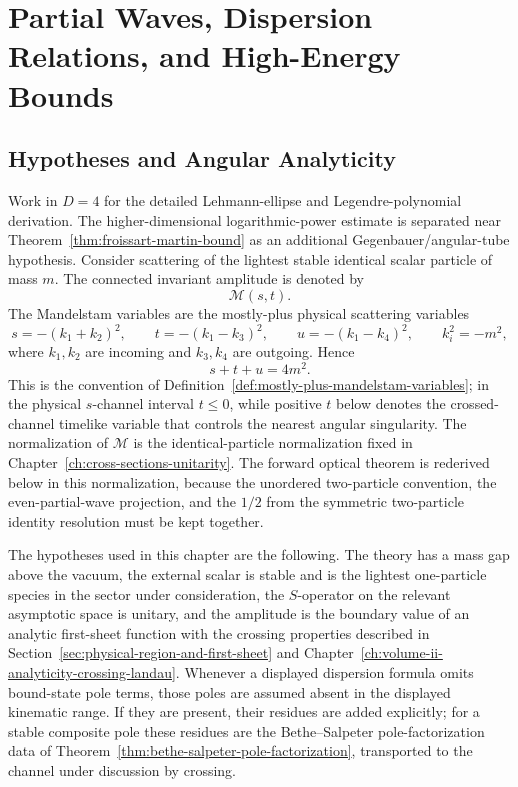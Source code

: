\chapter{Partial Waves, Dispersion Relations, and High-Energy Bounds}
\label{ch:volume-ii-07}
\ConventionsLorentzian


\section{Hypotheses and Angular Analyticity}

Work in \(D=4\) for the detailed Lehmann-ellipse and Legendre-polynomial
derivation.  The higher-dimensional logarithmic-power estimate is separated
near Theorem~\ref{thm:froissart-martin-bound} as an additional
Gegenbauer/angular-tube hypothesis.  Consider scattering of the lightest
stable identical scalar particle of mass \(m\).  The connected invariant
amplitude is denoted
by
\[
  \mathcal M(s,t).
\]
The Mandelstam variables are the mostly-plus physical scattering variables
\[
  s=-(k_1+k_2)^2,\qquad
  t=-(k_1-k_3)^2,\qquad
  u=-(k_1-k_4)^2,
  \qquad
  k_i^2=-m^2 ,
\]
where \(k_1,k_2\) are incoming and \(k_3,k_4\) are outgoing.  Hence
\[
  s+t+u=4m^2 .
\]
This is the convention of
Definition~\ref{def:mostly-plus-mandelstam-variables}; in the physical
\(s\)-channel interval \(t\le0\), while positive \(t\) below denotes the
crossed-channel timelike variable that controls the nearest angular
singularity.
The normalization of \(\mathcal M\) is the identical-particle normalization
fixed in Chapter~\ref{ch:cross-sections-unitarity}.  The forward optical
theorem is rederived below in this normalization, because the unordered
two-particle convention, the even-partial-wave projection, and the \(1/2\) from
the symmetric two-particle identity resolution must be kept together.

The hypotheses used in this chapter are the following.  The theory has a mass
gap above the vacuum, the external scalar is stable and is the lightest
one-particle species in the sector under consideration, the \(S\)-operator on
the relevant asymptotic space is unitary, and the amplitude is the boundary
value of an analytic first-sheet function with the crossing properties
described in Section~\ref{sec:physical-region-and-first-sheet} and
Chapter~\ref{ch:volume-ii-analyticity-crossing-landau}.  Whenever
a displayed dispersion formula omits bound-state pole terms, those poles are
assumed absent in the displayed kinematic range.  If they are present, their
residues are added explicitly; for a stable composite pole these residues are
the Bethe--Salpeter pole-factorization data of
Theorem~\ref{thm:bethe-salpeter-pole-factorization}, transported to the
channel under discussion by crossing.

